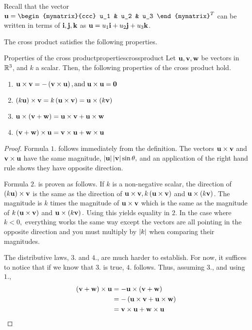 Recall that the vector $\vect{u}= \begin{mymatrix}{ccc}
u_1 & u_2 & u_3
\end{mymatrix}^T$
can be written in terms of ${\bf i}, {\bf j}, {\bf k}$ as ${\bf u}=u_{1}{\bf i}+u_{2}{\bf j}+u_{3}{\bf k}$. 

The cross product satisfies the following properties.

\begin{proposition}{Properties of the cross product}{propertiescrossproduct}
Let ${\bf u}, {\bf v}, {\bf w}$ be vectors in $\mathbb{R}^3$, and $k$ a scalar. Then, the following properties 
of the cross product hold.
\begin{enumerate}
\item 
${\bf u}\times {\bf v}= -\left({\bf v}\times {\bf u}\right), 
\mbox{and} \; {\bf u}\times {\bf u}={\bf 0}$
\item 
$\left(k {\bf u}\right)\times {\bf v}= k \left({\bf u}\times {\bf v}\right) 
={\bf u}\times \left(k {\bf v}\right)$
\item
${\bf u}\times \left({\bf v}+{\bf w}\right) ={\bf u}\times {\bf v}+{\bf u}\times {\bf w}$
\item 
$\left({\bf v}+{\bf w}\right) \times {\bf u}={\bf v} \times {\bf u}+{\bf w}\times {\bf u}$
\end{enumerate}
\end{proposition}

\begin{proof}
Formula $1.$ follows immediately from the definition. The vectors 
${\bf u}\times {\bf v}$ and ${\bf v}\times {\bf u}$ have the same magnitude, 
$\left|{\bf u}\right|\left|{\bf v}\right|\sin
\theta ,$ and an application of the right hand rule shows they have opposite
direction. 

Formula $2.$ is proven as follows. If $k $ is a
non-negative scalar, the direction of $\left(k {\bf u}\right)
\times {\bf v}$ is the same as the direction of ${\bf u}\times {\bf v},
k \left({\bf u}\times {\bf v}\right) $ and ${\bf u}\times \left(
k {\bf v}\right) $. The magnitude is  $k$ times the
magnitude of ${\bf u}\times {\bf v}$ which is the same as the magnitude of 
$k \left({\bf u}\times {\bf v}\right) $ and ${\bf u}\times \left(
k {\bf v}\right) .$ Using this yields equality in $2$. In
the case where $k <0,$ everything works the same way except the vectors
are all pointing in the opposite direction and you must multiply by 
$\left|k \right|$ when comparing their magnitudes. 

The distributive laws, $3.$ and $4.$, are much harder to establish. For now, it suffices to
 notice that if we know that $3.$ is true, $4.$ follows. Thus, assuming $3.$, and using $1.$,
\begin{align*}
\left({\bf v}+{\bf w}\right) \times {\bf u}& =-{\bf u}\times \left(
{\bf v}+{\bf w}\right) \\
& =-\left({\bf u}\times {\bf v}+{\bf u}\times {\bf w}\right) \\
& ={\bf v}\times {\bf u}+{\bf w}\times {\bf u}
\end{align*}
\end{proof}

